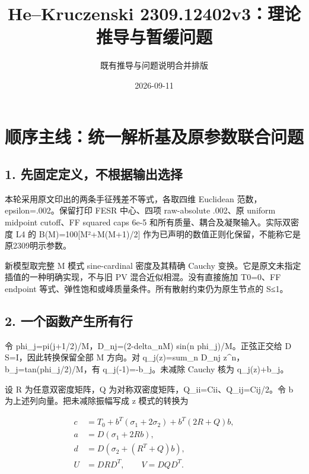 \documentclass[
  11pt,
  a4paper,
]{article}
\title{He--Kruczenski 2309.12402v3：理论推导与暂缓问题}
\subtitle{既有推导与问题说明合并排版}
\author{}
\date{2026-09-11}
\begin{document}
\maketitle

{
\setcounter{tocdepth}{2}
\tableofcontents
}
\section{顺序主线：统一解析基及原参数联合问题}\label{ux987aux5e8fux4e3bux7ebfux7edfux4e00ux89e3ux6790ux57faux53caux539fux53c2ux6570ux8054ux5408ux95eeux9898}

\subsection{1.
先固定定义，不根据输出选择}\label{ux5148ux56faux5b9aux5b9aux4e49ux4e0dux6839ux636eux8f93ux51faux9009ux62e9}

本轮采用原文印出的两条手征残差不等式，各取四维 Euclidean
范数，epsilon=.002。保留打印 FESR 中心、四项 raw-absolute .002、原
uniform midpoint cutoff、FF squared caps 6e-5
和所有质量、耦合及凝聚输入。实际双密度 L4 的 B(M)=100{[}M²+M(M+1)/2{]}
作为已声明的数值正则化保留，不能称它是原2309明示参数。

新模型取完整 M 模式 sine-cardinal 密度及其精确 Cauchy
变换。它是原文未指定插值的一种明确实现，不与旧 PV
混合近似相混。没有直接施加 T0=0、FF endpoint
等式、弹性饱和或峰质量条件。所有散射约束仍为原生节点的
\textbar S\textbar≤1。

\subsection{2.
一个函数产生所有行}\label{ux4e00ux4e2aux51fdux6570ux4ea7ux751fux6240ux6709ux884c}

令 phi\_j=pi(j+1/2)/M，D\_nj=(2-delta\_nM) sin(n phi\_j)/M。正弦正交给 D
S=I，因此转换保留全部 M 方向。对 q\_j(z)=sum\_n D\_nj
z\^{}n，b\_j=tan(phi\_j/2)/M，有 q\_j(-1)=-b\_j。未减除 Cauchy 核为
q\_j(z)+b\_j。

设 R 为任意双密度矩阵，Q 为对称双密度矩阵，Q\_ii=Cii、Q\_ij=Cij/2。令 b
为上述列向量。把未减除振幅写成 z 模式的转换为

\[
\begin{aligned}
c&=T_0+b^T(\sigma_1+2\sigma_2)+b^T(2R+Q)b,\\
a&=D(\sigma_1+2Rb),\\
d&=D(\sigma_2+(R^T+Q)b),\\
U&=DRD^T,\qquad V=DQD^T.
\end{aligned}
\]
\end{document}
